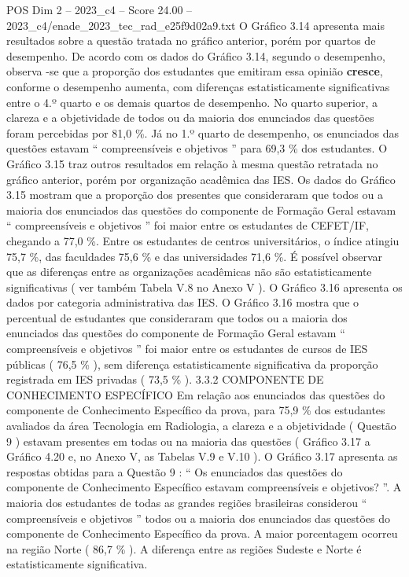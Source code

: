 \begin{textsample}{POS Dim 2 – 2023\_c4 – Score 24.00 – 2023\_c4/enade\_2023\_tec\_rad\_e25f9d02a9.txt}
O Gráfico 3.14 apresenta mais resultados sobre a questão tratada no gráfico anterior, porém por quartos de desempenho.
De acordo com os dados do Gráfico 3.14, segundo o desempenho, observa -se que a proporção dos estudantes que emitiram essa opinião \textbf{cresce}, conforme o desempenho aumenta, com diferenças estatisticamente significativas entre o 4.º quarto e os demais quartos de desempenho.
No quarto superior, a clareza e a objetividade de todos ou da maioria dos enunciados das questões foram percebidas por 81,0 \%.
Já no 1.º quarto de desempenho, os enunciados das questões estavam “ compreensíveis e objetivos ” para 69,3 \% dos estudantes.
O Gráfico 3.15 traz outros resultados em relação à mesma questão retratada no gráfico anterior, porém por organização acadêmica das IES.
Os dados do Gráfico 3.15 mostram que a proporção dos presentes que consideraram que todos ou a maioria dos enunciados das questões do componente de Formação Geral estavam “ compreensíveis e objetivos ” foi maior entre os estudantes de CEFET/IF, chegando a 77,0 \%.
Entre os estudantes de centros universitários, o índice atingiu 75,7 \%, das faculdades 75,6 \% e das universidades 71,6 \%.
É possível observar que as diferenças entre as organizações acadêmicas não são estatisticamente significativas ( ver também Tabela V.8 no Anexo V ).
O Gráfico 3.16 apresenta os dados por categoria administrativa das IES.
O Gráfico 3.16 mostra que o percentual de estudantes que consideraram que todos ou a maioria dos enunciados das questões do componente de Formação Geral estavam “ compreensíveis e objetivos ” foi maior entre os estudantes de cursos de IES públicas ( 76,5 \% ), sem diferença estatisticamente significativa da proporção registrada em IES privadas ( 73,5 \% ). 3.3.2 COMPONENTE DE CONHECIMENTO ESPECÍFICO Em relação aos enunciados das questões do componente de Conhecimento Específico da prova, para 75,9 \% dos estudantes avaliados da área Tecnologia em Radiologia, a clareza e a objetividade ( Questão 9 ) estavam presentes em todas ou na maioria das questões ( Gráfico 3.17 a Gráfico 4.20 e, no Anexo V, as Tabelas V.9 e V.10 ).
O Gráfico 3.17 apresenta as respostas obtidas para a Questão 9 : “ Os enunciados das questões do componente de Conhecimento Específico estavam compreensíveis e objetivos? ”.
A maioria dos estudantes de todas as grandes regiões brasileiras considerou “ compreensíveis e objetivos ” todos ou a maioria dos enunciados das questões do componente de Conhecimento Específico da prova.
A maior porcentagem ocorreu na região Norte ( 86,7 \% ).
A diferença entre as regiões Sudeste e Norte é estatisticamente significativa.

\end{textsample}
